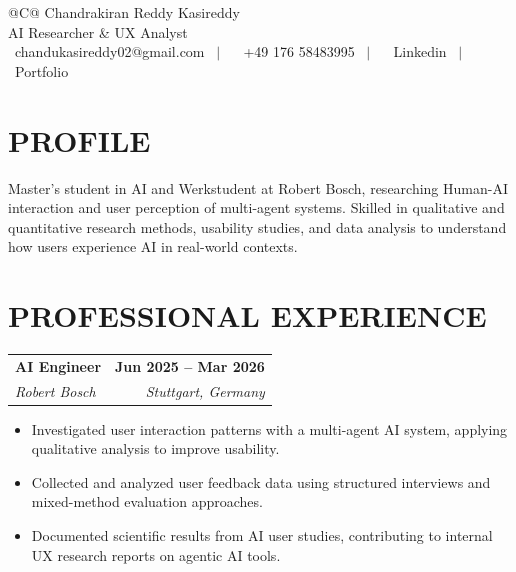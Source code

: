 \documentclass[a4paper,11pt]{article}
\makeatletter
\newcommand{\entryheader}[4]{%
  \begin{tabularx}{\textwidth}{@{}>{\RaggedRight\arraybackslash}X r@{}}
    \textbf{#1} & \textbf{#2} \\
    \textit{#3} & \textit{#4} \\
  \end{tabularx}%
}
\newenvironment{entrybullets}{%
  \begin{minipage}[t]{0.77\textwidth}
    \begin{itemize}[leftmargin=*,label=\textbullet,align=left]
}{%
    \end{itemize}
  \end{minipage}
}
\newcommand{\safehref}[2]{#2}
\let\href\safehref
\makeatother
\begin{document}
\pagestyle{empty}

\begin{tabularx}{\linewidth}{@{}C@{}}
  \Huge{Chandrakiran Reddy Kasireddy}\\[10pt]
  
  \large{AI Researcher \& UX Analyst}\\[3pt]


  \href{mailto: chandukasireddy02@gmail.com}{\raisebox{-0.05\height}{\faEnvelope} \ chandukasireddy02@gmail.com} \ $|$ \
  \href{tel:+49 176 58483995}{ \ +49 176 58483995} \ $|$ \
  \href{https://www.linkedin.com/in/chandukasireddy/}{\raisebox{-0.05\height}{\faLinkedin} \ Linkedin} \ $|$ \
  \href{https://chandu.graspins.com/}{\raisebox{-0.05\height}{\faLink} \ Portfolio}\\
\end{tabularx}

\section*{PROFILE}
Master's student in AI and Werkstudent at Robert Bosch, researching Human-AI interaction and user perception of multi-agent systems. Skilled in qualitative and quantitative research methods, usability studies, and data analysis to understand how users experience AI in real-world contexts.


\section*{PROFESSIONAL EXPERIENCE}
\entryheader{AI Engineer}{Jun 2025 -- Mar 2026}{Robert Bosch}{Stuttgart, Germany}
\begin{entrybullets}
  \item Investigated user interaction patterns with a multi-agent AI system, applying qualitative analysis to improve usability.
  \item Collected and analyzed user feedback data using structured interviews and mixed-method evaluation approaches.
  \item Documented scientific results from AI user studies, contributing to internal UX research reports on agentic AI tools.
\end{entrybullets}
\end{document}
